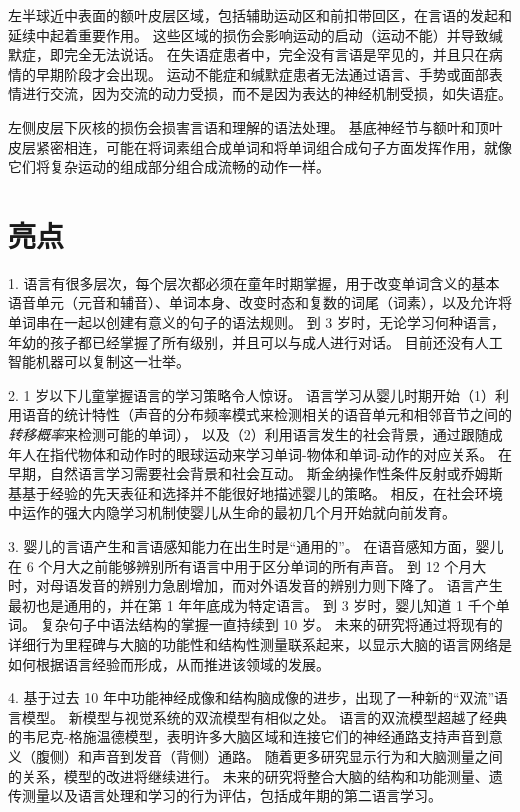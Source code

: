 左半球近中表面的额叶皮层区域，包括辅助运动区和前扣带回区，在言语的发起和延续中起着重要作用。
这些区域的损伤会影响运动的启动（运动不能）并导致缄默症，即完全无法说话。
在失语症患者中，完全没有言语是罕见的，并且只在病情的早期阶段才会出现。
运动不能症和缄默症患者无法通过语言、手势或面部表情进行交流，因为交流的动力受损，而不是因为表达的神经机制受损，如失语症。


左侧皮层下灰核的损伤会损害言语和理解的语法处理。
基底神经节与额叶和顶叶皮层紧密相连，可能在将词素组合成单词和将单词组合成句子方面发挥作用，就像它们将复杂运动的组成部分组合成流畅的动作一样。



\section{亮点}

1. 语言有很多层次，每个层次都必须在童年时期掌握，用于改变单词含义的基本语音单元（元音和辅音）、单词本身、改变时态和复数的词尾（词素），以及允许将单词串在一起以创建有意义的句子的语法规则。
到 3 岁时，无论学习何种语言，年幼的孩子都已经掌握了所有级别，并且可以与成人进行对话。
目前还没有人工智能机器可以复制这一壮举。 


2. 1 岁以下儿童掌握语言的学习策略令人惊讶。
语言学习从婴儿时期开始（1）利用语音的统计特性（声音的分布频率模式来检测相关的语音单元和相邻音节之间的\textit{转移概率}来检测可能的单词），
以及（2）利用语言发生的社会背景，通过跟随成年人在指代物体和动作时的眼球运动来学习单词-物体和单词-动作的对应关系。
在早期，自然语言学习需要社会背景和社会互动。
斯金纳操作性条件反射或乔姆斯基基于经验的先天表征和选择并不能很好地描述婴儿的策略。
相反，在社会环境中运作的强大内隐学习机制使婴儿从生命的最初几个月开始就向前发育。


3. 婴儿的言语产生和言语感知能力在出生时是“通用的”。
在语音感知方面，婴儿在 6 个月大之前能够辨别所有语言中用于区分单词的所有声音。
到 12 个月大时，对母语发音的辨别力急剧增加，而对外语发音的辨别力则下降了。
语言产生最初也是通用的，并在第 1 年年底成为特定语言。
到 3 岁时，婴儿知道 1 千个单词。
复杂句子中语法结构的掌握一直持续到 10 岁。
未来的研究将通过将现有的详细行为里程碑与大脑的功能性和结构性测量联系起来，以显示大脑的语言网络是如何根据语言经验而形成，从而推进该领域的发展。


4. 基于过去 10 年中功能神经成像和结构脑成像的进步，出现了一种新的“双流”语言模型。
新模型与视觉系统的双流模型有相似之处。
语言的双流模型超越了经典的韦尼克-格施温德模型，表明许多大脑区域和连接它们的神经通路支持声音到意义（腹侧）和声音到发音（背侧）通路。
随着更多研究显示行为和大脑测量之间的关系，模型的改进将继续进行。
未来的研究将整合大脑的结构和功能测量、遗传测量以及语言处理和学习的行为评估，包括成年期的第二语言学习。


